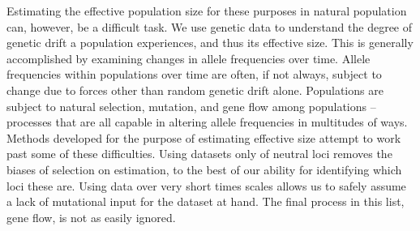 Estimating the effective population size for these purposes in natural population can, however, be a difficult task. We use genetic data to understand the degree of genetic drift a population experiences, and thus its effective size. This is generally accomplished by examining changes in allele frequencies over time. Allele frequencies within populations over time are often, if not always, subject to change due to forces other than random genetic drift alone. Populations are subject to natural selection, mutation, and gene flow among populations -- processes that are all capable in altering allele frequencies in multitudes of ways. Methods developed for the purpose of estimating effective size attempt to work past some of these difficulties. Using datasets only of neutral loci removes the biases of selection on estimation, to the best of our ability for identifying which loci these are. Using data over very short times scales allows us to safely assume a lack of mutational input for the dataset at hand. The final process in this list, gene flow, is not as easily ignored.

